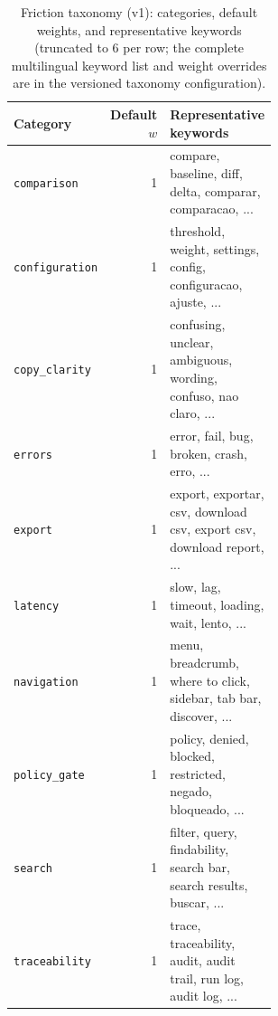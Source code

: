 \begin{table}[H]
\centering
\small
\caption{Friction taxonomy (v1): categories, default weights, and representative keywords (truncated to 6 per row; the complete multilingual keyword list and weight overrides are in the versioned taxonomy configuration).}
\label{tab:friction-taxonomy}
\begin{tabular}{lrp{0.58\linewidth}}
\toprule
Category & Default $w$ & Representative keywords \\
\midrule
\texttt{comparison} & 1 & compare, baseline, diff, delta, comparar, comparacao, ... \\
\texttt{configuration} & 1 & threshold, weight, settings, config, configuracao, ajuste, ... \\
\texttt{copy\_clarity} & 1 & confusing, unclear, ambiguous, wording, confuso, nao claro, ... \\
\texttt{errors} & 1 & error, fail, bug, broken, crash, erro, ... \\
\texttt{export} & 1 & export, exportar, csv, download csv, export csv, download report, ... \\
\texttt{latency} & 1 & slow, lag, timeout, loading, wait, lento, ... \\
\texttt{navigation} & 1 & menu, breadcrumb, where to click, sidebar, tab bar, discover, ... \\
\texttt{policy\_gate} & 1 & policy, denied, blocked, restricted, negado, bloqueado, ... \\
\texttt{search} & 1 & filter, query, findability, search bar, search results, buscar, ... \\
\texttt{traceability} & 1 & trace, traceability, audit, audit trail, run log, audit log, ... \\
\bottomrule
\end{tabular}
\end{table}
